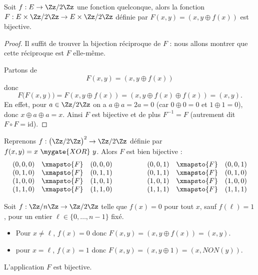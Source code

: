 \documentclass[11pt,class=report,crop=false]{standalone}
\begin{document}
\begin{lemme}
Soit $f : E \to \Zz/2\Zz$ une fonction quelconque, alors  la fonction
$F : E \times \Zz/2\Zz \to E \times \Zz/2\Zz$ définie par $F(x,y) = (x, y \oplus f(x))$ est bijective.
\end{lemme}

\begin{proof}
Il suffit de trouver la bijection réciproque de $F$ : nous allons montrer que cette réciproque est $F$ elle-même.

Partons de 
$$F(x,y) = (x, y \oplus f(x))$$
donc 
$$F\big(F(x,y)\big) = F(x, y \oplus f(x)) = (x, y \oplus f(x) \oplus f(x)) = (x,y).$$
En effet, pour $a \in \Zz/2\Zz$ on a $a \oplus a = 2a = 0$ (car $0 \oplus 0 = 0$ et $1 \oplus 1=0$), donc $x\oplus a \oplus a=x$.
Ainsi $F$ est bijective et de plus $F^{-1} = F$ (autrement dit $F \circ F = \text{id}$).
\end{proof}


\begin{exemple} 
Reprenons $f : \big(\Zz/2\Zz\big)^2 \to \Zz/2\Zz$ définie par $f(x,y) = x\ \mygate{XOR}\ y$. Alors $F$ est bien bijective :
$$
\begin{array}{rcl}
(0,0,0) &\xmapsto{F}& (0,0,0) \\
(0,1,0) &\xmapsto{F}& (0,1,1) \\
(1,0,0) &\xmapsto{F}& (1,0,1) \\
(1,1,0) &\xmapsto{F}& (1,1,0) \\
\end{array}
\qquad\qquad
\begin{array}{rcl}
(0,0,1) &\xmapsto{F}& (0,0,1) \\
(0,1,1) &\xmapsto{F}& (0,1,0) \\
(1,0,1) &\xmapsto{F}& (1,0,0) \\
(1,1,1) &\xmapsto{F}& (1,1,1) \\
\end{array}
$$
\end{exemple}

\begin{exemple} 
Soit $f : \Zz/n\Zz \to \Zz/2\Zz$ telle que $f(x)=0$ pour tout $x$, sauf $f(\ell)=1$, pour un entier $\ell \in \{0,\ldots,n-1\}$ fixé.
\begin{itemize}
  \item Pour $x\neq \ell$, $f(x)=0$ donc $F(x,y) = (x,y \oplus f(x)) = (x,y)$.
  \item pour $x = \ell$,  $f(x)=1$ donc $F(x,y) = (x,y \oplus 1) = (x,NON(y))$.
\end{itemize}
L'application $F$ est bijective.
\end{exemple}
\end{document}
